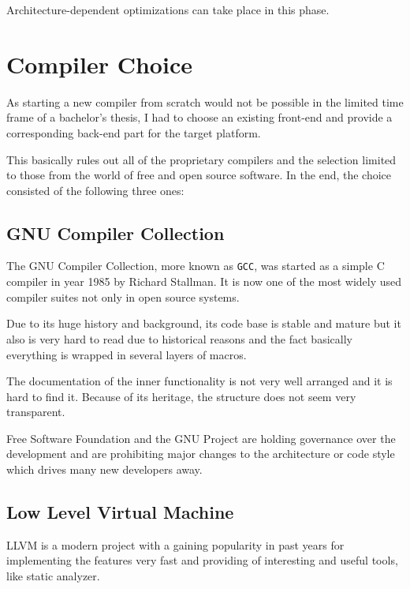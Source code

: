             Architecture-dependent optimizations can take place in this phase.

\chapter{Compiler Choice}\label{compiler}

As starting a new compiler from scratch would not be possible in the limited time frame of a bachelor's thesis, I had to choose an existing front-end and provide a corresponding back-end part for the target platform.

This basically rules out all of the proprietary compilers and the selection limited to those from the world of free and open source software. In the end, the choice consisted of the following three ones:


    \section{GNU Compiler Collection}\label{gcc}

    The GNU Compiler Collection, more known as \texttt{GCC}, was started as a simple C compiler in year 1985 by Richard Stallman. It is now one of the most widely used compiler suites not only in open source systems.

    Due to its huge history and background, its code base is stable and mature but it also is very hard to read due to historical reasons and the fact basically everything is wrapped in several layers of macros.

    The documentation of the inner functionality is not very well arranged and it is hard to find it. Because of its heritage, the structure does not seem very transparent.

    Free Software Foundation and the GNU Project are holding governance over the development and are prohibiting major changes to the architecture or code style which drives many new developers away.

    \section{Low Level Virtual Machine}\label{llvm}

    LLVM is a modern project with a gaining popularity in past years for implementing the features very fast and providing of interesting and useful tools, like static analyzer.

